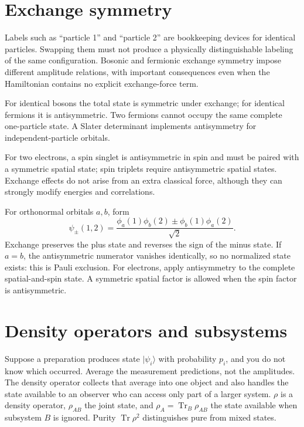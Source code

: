 \documentclass[11pt,oneside]{book}
\newcommand{\ket}[1]{\lvert #1\rangle}
\theoremstyle{reviewstyle}
\begin{document}
\section{Exchange symmetry}
Labels such as ``particle 1'' and ``particle 2'' are bookkeeping devices for identical particles. Swapping them must not produce a physically distinguishable labeling of the same configuration. Bosonic and fermionic exchange symmetry impose different amplitude relations, with important consequences even when the Hamiltonian contains no explicit exchange-force term.

For identical bosons the total state is symmetric under exchange; for identical fermions it is antisymmetric. Two fermions cannot occupy the same complete one-particle state. A Slater determinant implements antisymmetry for independent-particle orbitals.

For two electrons, a spin singlet is antisymmetric in spin and must be paired with a symmetric spatial state; spin triplets require antisymmetric spatial states. Exchange effects do not arise from an extra classical force, although they can strongly modify energies and correlations.

For orthonormal orbitals $a,b$, form
\begin{equation}
\psi_\pm(1,2)=\frac{\phi_a(1)\phi_b(2)\pm\phi_b(1)\phi_a(2)}{\sqrt2}.
\end{equation}
Exchange preserves the plus state and reverses the sign of the minus state. If $a=b$, the antisymmetric numerator vanishes identically, so no normalized state exists: this is Pauli exclusion. For electrons, apply antisymmetry to the complete spatial-and-spin state. A symmetric spatial factor is allowed when the spin factor is antisymmetric.

\section{Density operators and subsystems}
Suppose a preparation produces state $\ket{\psi_i}$ with probability $p_i$, and you do not know which occurred. Average the measurement predictions, not the amplitudes. The density operator collects that average into one object and also handles the state available to an observer who can access only part of a larger system. $\rho$ is a density operator, $\rho_{AB}$ the joint state, and $\rho_A=\operatorname{Tr}_B\rho_{AB}$ the state available when subsystem $B$ is ignored. Purity $\operatorname{Tr}\rho^2$ distinguishes pure from mixed states.
\end{document}
